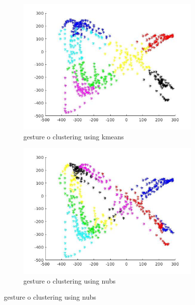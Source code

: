 \documentclass{article}
\begin{document}
\begin{figure}[ht]
\begin{subfigure}{.5\textwidth}
		\includegraphics[width=1.\linewidth]{kmean3.jpg}  
		\caption{gesture o clustering using kmeans}
	\end{subfigure}
	\begin{subfigure}{.5\textwidth}
		\centering
		\includegraphics[width=1.\linewidth]{nubs3.jpg}  
		\caption{gesture o clustering using nubs}
	\end{subfigure}
\end{figure}
\end{document}
